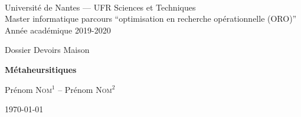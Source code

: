 \documentclass[a4paper,10pt]{article}
\begin{document}
~
\vspace{50mm}
{\large
\begin{center}
  Université de Nantes --- UFR Sciences et Techniques\\
  Master informatique parcours ``optimisation en recherche opérationnelle (ORO)''\\
  Année académique 2019-2020
  \vspace{30mm}
 
  { \LARGE
 
     Dossier Devoirs Maison\\
     \vspace{5mm}
 
     {\huge \textbf{Métaheursitiques}}
     \vspace{5mm}
 
     Prénom \textsc{Nom}$^1$ --  Prénom \textsc{Nom}$^2$
     \vspace{50mm}
  
     \today
  }  
\end{center}
}

\vfill
\break






\end{document}
